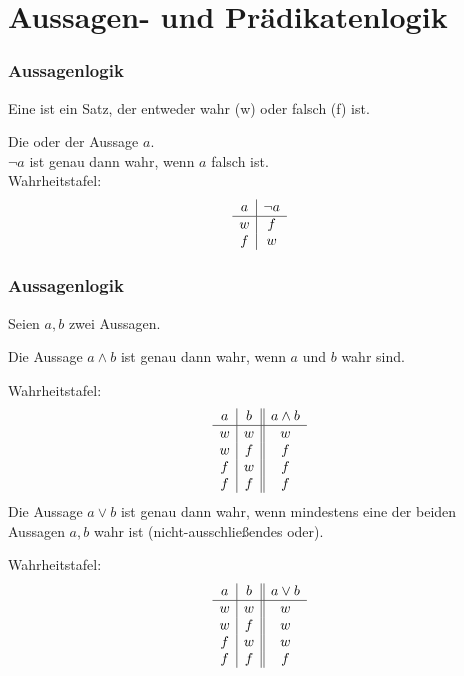 \section{Aussagen- und Prädikatenlogik}
%
\begin{frame}\frametitle{Aussagenlogik}
	
	\begin{definition}
		Eine  ist ein Satz, der entweder wahr (w) oder falsch (f) ist.
	\end{definition}\vfill \pause
		Die  oder  der Aussage $a$.\\[1mm]
	$\neg a$ ist genau dann wahr, wenn $a$ falsch ist.\\

	\vfill
	Wahrheitstafel:
	$$
		\begin{array}{c | c}
			a	& \neg a	\\ \hline
			w	& f		\\
			f	& w
		\end{array}
	$$
\end{frame}
%
\begin{frame}\frametitle{Aussagenlogik}
		
	Seien $a, b$ zwei Aussagen. \pause

		Die Aussage $a \land b$ ist genau dann wahr, wenn $a$ und $b$ wahr sind.

	\vfill
	Wahrheitstafel:
	$$
		\begin{array}{c | c || c}
			a	& b	& a\land b	\\ \hline
			w	& w	& w		\\
			w	& f	& f		\\
			f	& w	& f		\\
			f	& f	& f	
		\end{array}
	$$\pause
		Die Aussage $a \lor b$ ist genau dann wahr, wenn mindestens eine der beiden Aussagen $a, b$ wahr ist 
	(nicht-ausschließendes oder).

	\vfill
	Wahrheitstafel:
	$$
		\begin{array}{c | c || c}
			a	& b	& a\lor b	\\ \hline
			w	& w	& w		\\
			w	& f	& w		\\
			f	& w	& w		\\
			f	& f	& f	
		\end{array}
	$$
\end{frame}
%
%
